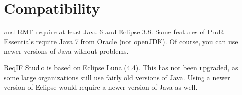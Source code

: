 \section{Compatibility}

\pror{} and RMF require at least Java 6 and Eclipse 3.8.  Some features of ProR Essentials require Java 7 from Oracle (not openJDK). Of course, you can use newer versions of Java without problems.

ReqIF Studio is based on Eclipse Luna (4.4). This has not been upgraded, as some large organizations still use fairly old versions of Java. Using a newer version of Eclipse would require a newer version of Java as well.

